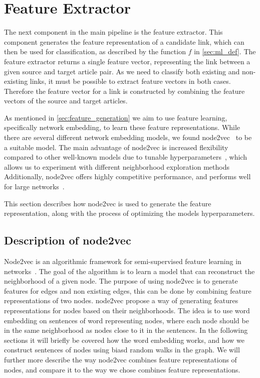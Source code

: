 \section{Feature Extractor}\label{feature_extractor}
The next component in the main pipeline is the feature extractor. This component generates the feature representation of a candidate link, which can then be used for classification, as described by the function $f$ in \cref{sec:ml_def}. The feature extractor returns a single feature vector, representing the link between a given source and target article pair. As we need to classify both existing and non-existing links, it must be possible to extract feature vectors in both cases. Therefore the feature vector for a link is constructed by combining the feature vectors of the source and target articles.

As mentioned in \cref{sec:feature_generation} we aim to use feature learning, specifically network embedding, to learn these feature representations. While there are several different network embedding models, we found node2vec~\cite{node2vec} to be a suitable model. The main advantage of node2vec is increased flexibility compared to other well-known models due to tunable hyperparameters~\cite{node2vec}, which allows us to experiment with different neighborhood exploration methods Additionally, node2vec offers highly competitive performance, and performs well for large networks~\cite{node2vec}.

This section describes how node2vec is used to generate the feature representation, along with the process of optimizing the models hyperparameters.

\subsection{Description of node2vec}
\label{sec:node2vec}
Node2vec is an algorithmic framework for semi-supervised feature learning in networks~\cite{node2vec}. The goal of the algorithm is to learn a model that can reconstruct the neighborhood of a given node.
The purpose of using node2vec is to generate features for edges and non existing edges, this can be done by combining feature representations of two nodes. node2vec propose a way of generating features representations for nodes based on their neighborhoods. The idea is to use word embedding on sentences of word representing nodes, where each node should be in the same neighborhood as nodes close to it in the sentences. In the following sections it will briefly be covered how the word embedding works, and how we construct sentences of nodes using biasd random walks in the graph. We will further more describe the way node2vec combines feature representations of nodes, and compare it to the way we chose combines feature representations.

